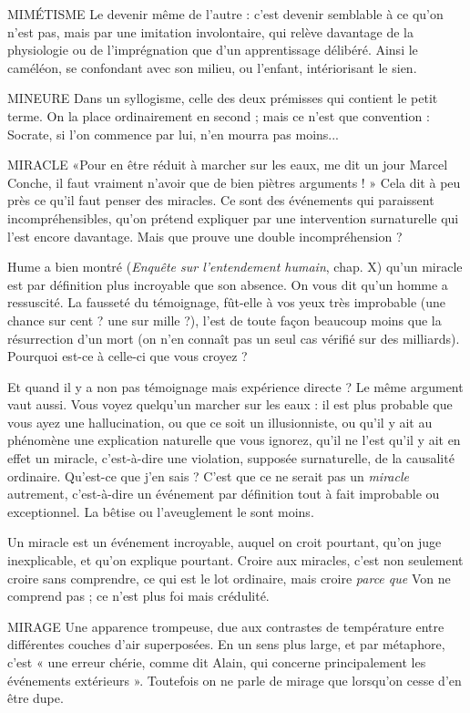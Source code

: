 MIMÉTISME Le devenir même de l’autre : c’est devenir semblable à ce
qu’on n’est pas, mais par une imitation involontaire, qui
relève davantage de la physiologie ou de l’imprégnation que d’un apprentissage
délibéré. Ainsi le caméléon, se confondant avec son milieu, ou l’enfant, intériorisant
le sien.

MINEURE Dans un syllogisme, celle des deux prémisses qui contient le
petit terme. On la place ordinairement en second ; mais ce n’est
que convention : Socrate, si l’on commence par lui, n’en mourra pas moins...

MIRACLE «Pour en être réduit à marcher sur les eaux, me dit un jour
Marcel Conche, il faut vraiment n'avoir que de bien piètres
arguments ! » Cela dit à peu près ce qu’il faut penser des miracles. Ce sont des
événements qui paraissent incompréhensibles, qu’on prétend expliquer par une
intervention surnaturelle qui l’est encore davantage. Mais que prouve une
double incompréhension ?

Hume a bien montré ({\it Enquête sur l'entendement humain}, chap. X) qu’un
miracle est par définition plus incroyable que son absence. On vous dit qu’un
homme a ressuscité. La fausseté du témoignage, fût-elle à vos yeux très improbable
(une chance sur cent ? une sur mille ?), l’est de toute façon beaucoup
moins que la résurrection d’un mort (on n’en connaît pas un seul cas vérifié sur
des milliards). Pourquoi est-ce à celle-ci que vous croyez ?

Et quand il y a non pas témoignage mais expérience directe ? Le même
argument vaut aussi. Vous voyez quelqu'un marcher sur les eaux : il est plus
probable que vous ayez une hallucination, ou que ce soit un illusionniste, ou
qu'il y ait au phénomène une explication naturelle que vous ignorez, qu’il ne
l’est qu’il y ait en effet un miracle, c’est-à-dire une violation, supposée surnaturelle,
de la causalité ordinaire. Qu'est-ce que j’en sais ? C’est que ce ne serait pas
un {\it miracle} autrement, c’est-à-dire un événement par définition tout à fait
improbable ou exceptionnel. La bêtise ou l’aveuglement le sont moins.

Un miracle est un événement incroyable, auquel on croit pourtant, qu’on
juge inexplicable, et qu’on explique pourtant. Croire aux miracles, c’est non
seulement croire sans comprendre, ce qui est le lot ordinaire, mais croire {\it parce
que} Von ne comprend pas ; ce n’est plus foi mais crédulité.

MIRAGE Une apparence trompeuse, due aux contrastes de température
entre différentes couches d’air superposées. En un sens plus large,
et par métaphore, c’est « une erreur chérie, comme dit Alain, qui concerne
principalement les événements extérieurs ». Toutefois on ne parle de mirage
que lorsqu'on cesse d’en être dupe.

